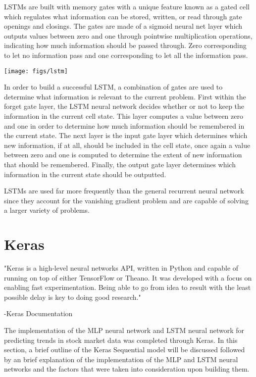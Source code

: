\documentclass[twocolumn]{webofc}
\begin{document}
LSTMs are built with memory gates with a unique feature known as a gated cell which regulates what information can be stored, written, or read through gate openings and closings. The gates are made of a sigmoid neural net layer which outputs values between zero and one through pointwise multiplication operations, indicating how much information should be passed through. Zero corresponding to let no information pass and one corresponding to let all the information pass. 

\texttt{[image: figs/lstm]}

In order to build a successful LSTM, a combination of gates are used to determine what information is relevant to the current problem. First within the forget gate layer, the LSTM neural network decides whether or not to keep the information in the current cell state. This layer computes a value between zero and one in order to determine how much information should be remembered in the current state. The next layer is the input gate layer which determines which new information, if at all, should be included in the cell state, once again a value between zero and one is computed to determine the extent of new information that should be remembered. Finally, the output gate layer determines which information in the current state should be outputted. 

LSTMs are used far more frequently than the general recurrent neural network since they account for the vanishing gradient problem and are capable of solving a larger variety of problems.
\section{Keras}\label{models}

"Keras is a high-level neural networks API, written in Python and capable of running on top of either TensorFlow or Theano. It was developed with a focus on enabling fast experimentation. Being able to go from idea to result with the least possible delay is key to doing good research."

-Keras Documentation

The implementation of the MLP neural network and LSTM neural network for predicting trends in stock market data was completed through Keras. In this section, a brief outline of the Keras Sequential model will be discussed followed by an brief explanation of the implementation of the MLP and LSTM neural networks and the factors that were taken into consideration upon building them. 
\end{document}
